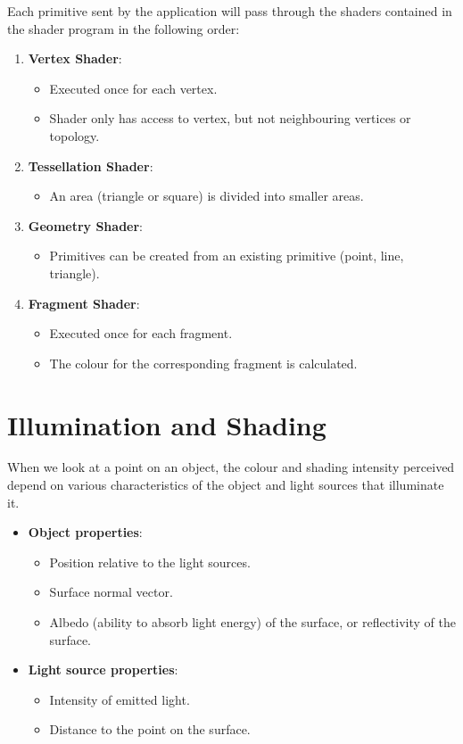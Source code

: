 \documentclass[11pt]{article}
\begin{document}
Each primitive sent by the application will pass through the shaders contained in the shader program in the following order:
\begin{enumerate}
  \item \textbf{Vertex Shader}:
    \begin{itemize}
      \item Executed once for each vertex.
      \item Shader only has access to vertex, but not neighbouring vertices or topology.
    \end{itemize}
  \item \textbf{Tessellation Shader}:
    \begin{itemize}
      \item An area (triangle or square) is divided into smaller areas.
    \end{itemize}
  \item \textbf{Geometry Shader}:
    \begin{itemize}
      \item Primitives can be created from an existing primitive (point, line, triangle).
    \end{itemize}
  \item \textbf{Fragment Shader}:
    \begin{itemize}
      \item Executed once for each fragment.
      \item The colour for the corresponding fragment is calculated.
    \end{itemize}
\end{enumerate}

\section{Illumination and Shading}
When we look at a point on an object, the colour and shading intensity perceived depend on various characteristics of the object and light sources that illuminate it.
\begin{itemize}
  \item \textbf{Object properties}:
    \begin{itemize}
      \item Position relative to the light sources.
      \item Surface normal vector.
      \item Albedo (ability to absorb light energy) of the surface, or reflectivity of the surface.
    \end{itemize}
  \item \textbf{Light source properties}:
    \begin{itemize}
      \item Intensity of emitted light.
      \item Distance to the point on the surface.
    \end{itemize}
\end{itemize}
\end{document}
